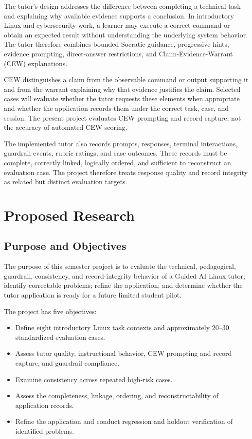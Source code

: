 \documentclass[conference]{IEEEtran}
\begin{document}
The tutor's design addresses the difference between completing a technical task and explaining why available evidence supports a conclusion. In introductory Linux and cybersecurity work, a learner may execute a correct command or obtain an expected result without understanding the underlying system behavior. The tutor therefore combines bounded Socratic guidance, progressive hints, evidence prompting, direct-answer restrictions, and Claim-Evidence-Warrant (CEW) explanations.

CEW distinguishes a claim from the observable command or output supporting it and from the warrant explaining why that evidence justifies the claim. Selected cases will evaluate whether the tutor requests these elements when appropriate and whether the application records them under the correct task, case, and session. The present project evaluates CEW prompting and record capture, not the accuracy of automated CEW scoring.

The implemented tutor also records prompts, responses, terminal interactions, guardrail events, rubric ratings, and case outcomes. These records must be complete, correctly linked, logically ordered, and sufficient to reconstruct an evaluation case. The project therefore treats response quality and record integrity as related but distinct evaluation targets.

\section{Proposed Research}

\subsection{Purpose and Objectives}

The purpose of this semester project is to evaluate the technical,
pedagogical, guardrail, consistency, and record-integrity behavior of a
Guided AI Linux tutor; identify correctable problems; refine the
application; and determine whether the tutor application is ready for a
future limited student pilot.

The project has five objectives:

\begin{itemize}
\item
  Define eight introductory Linux task contexts and approximately 20--30
  standardized evaluation cases.
\item
  Assess tutor quality, instructional behavior, CEW prompting and record
  capture, and guardrail compliance.
\item
  Examine consistency across repeated high-risk cases.
\item
  Assess the completeness, linkage, ordering, and reconstructability of
  application records.
\item
  Refine the application and conduct regression and holdout verification of identified
  problems.
\end{itemize}
\end{document}
